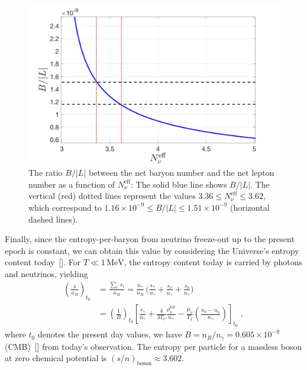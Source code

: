 \begin{figure}[h]
\begin{center}
\includegraphics[width=\textwidth]{./plots/Ratio_BL}
\caption{The ratio $B/|L|$ between the net baryon number and the net lepton number as a function of $N^{\mathrm{eff}}_\nu$: The solid blue line shows $B/|L|$. The vertical (red) dotted lines represent the values $3.36\leqslant N_\nu^{\mathrm{eff}}\leqslant3.62$, which correspond to $1.16 \times 10^{-9}\leqslant B/|L|\leqslant 1.51 \times 10^{-9}$ (horizontal dashed lines).}
\label{BL_Ratio}
\end{center}
\end{figure}

Finally, since the entropy-per-baryon from neutrino freeze-out up to the present epoch is constant, we can obtain this value by considering the Universe's entropy content today~[\cite{Fromerth:2012fe}]. For $T\ll1\,\mathrm{MeV}$, the entropy content today is carried by photons and neutrinos, yielding
\begin{align}
\label{Nb_S}
\left(\frac{s}{n_B}\right)_{t_0}&=\frac{\sum_i\,s_i}{n_B}=\frac{n_\gamma}{n_B}\,\bigg(\frac{s_\gamma}{n_\gamma}+\frac{s_\nu}{n_\gamma}+\frac{s_{\bar{\nu}}}{n_\gamma}\bigg)\;\\
&=\left(\frac{1}{B}\right)_{\!\!t_0}\!\!\left[\frac{s_\gamma}{n_\gamma}+\frac{4}{3T_\nu}\frac{\rho_\nu^{\mathrm{tot}}}{n_\gamma}-\frac{\mu_\nu}{T_f}\left(\frac{n_\nu-n_{\bar{\nu}}}{n_\gamma}\right)\right]_{t_0}\;,
\end{align}
where $t_0$ denotes the present day values, we have $B=n_B/n_\gamma= 0.605\times10^{-9}$ (CMB)~[\cite{ParticleDataGroup:2016lqr}] from today's observation. The entropy per particle for a massless boson at zero chemical potential is $(s/n)_{\mathrm{boson}}\approx 3.602$.

